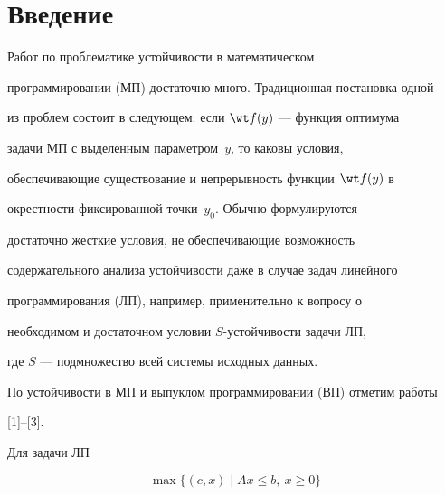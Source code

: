 \pagestyle{plain} %







\maketitle


\label{begin}





\section{Введение}





Работ по проблематике устойчивости в математическом


программировании (МП) достаточно много. Традиционная постановка одной


из проблем состоит в следующем: если $\wt f(y)$ --- функция оптимума


задачи МП с выделенным параметром~$y$, то каковы условия,


обеспечивающие существование и непрерывность функции $\wt f(y)$ в


окрестности фиксированной точки~$y_0$. Обычно формулируются


достаточно жесткие условия, не обеспечивающие возможность


содержательного анализа устойчивости даже в случае задач линейного


программирования (ЛП), например, применительно к вопросу о


необходимом и достаточном условии $S$-устойчивости задачи ЛП,


где $S$ --- подмножество всей системы исходных данных.


По устойчивости в МП и выпуклом программировании (ВП) отметим работы


[1]--[3].





Для задачи ЛП


\begin{equation}


\max\{(c,x)\mid Ax\leq b,\ x\geq 0\}


\end{equation}


